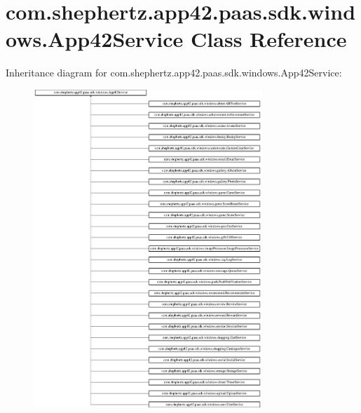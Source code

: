 \hypertarget{classcom_1_1shephertz_1_1app42_1_1paas_1_1sdk_1_1windows_1_1_app42_service}{\section{com.\+shephertz.\+app42.\+paas.\+sdk.\+windows.\+App42\+Service Class Reference}
\label{classcom_1_1shephertz_1_1app42_1_1paas_1_1sdk_1_1windows_1_1_app42_service}
}
Inheritance diagram for com.\+shephertz.\+app42.\+paas.\+sdk.\+windows.\+App42\+Service\+:\begin{figure}[H]
\begin{center}
\leavevmode
\includegraphics[height=12.000000cm]{classcom_1_1shephertz_1_1app42_1_1paas_1_1sdk_1_1windows_1_1_app42_service}
\end{center}
\end{figure}

